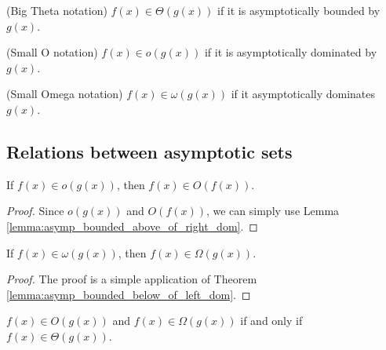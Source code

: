 \begin{definition}(Big Theta notation)
    \label{def:big_theta}
    \leanok
    $f(x) \in \Theta(g(x))$ if it is asymptotically bounded by $g(x)$. 
\end{definition}

\begin{definition}(Small O notation)
    \label{def:small_o}
    \leanok
    $f(x) \in o(g(x))$ if it is asymptotically dominated by $g(x)$.
\end{definition}

\begin{definition}(Small Omega notation)
    \label{def:small_omega}
    \leanok
    $f(x) \in \omega(g(x))$ if it asymptotically dominates $g(x)$.
\end{definition}


\subsection{Relations between asymptotic sets} \begin{lemma}
    \label{lemma:big_o_of_small_o}
    \leanok
    If $f(x) \in o(g(x))$, then $f(x) \in O(f(x))$.
\end{lemma}

\begin{proof}
    \leanok
    Since $o(g(x))$ and $O(f(x))$, we can simply use Lemma 
    \ref{lemma:asymp_bounded_above_of_right_dom}.
\end{proof}

\begin{theorem}
    \label{thm:big_omega_of_small_omega}
    \leanok
    If $f(x) \in \omega(g(x))$, then $f(x) \in \Omega(g(x))$.
\end{theorem}

\begin{proof}
    \leanok
    The proof is a simple application of Theorem 
    \ref{lemma:asymp_bounded_below_of_left_dom}.
\end{proof}

\begin{theorem}
    \label{thm:big_o_and_omega_iff_theta}
    \leanok
    $f(x) \in O(g(x))$ and $f(x) \in \Omega(g(x))$ if and only if $f(x) \in \Theta(g(x))$.
\end{theorem}

